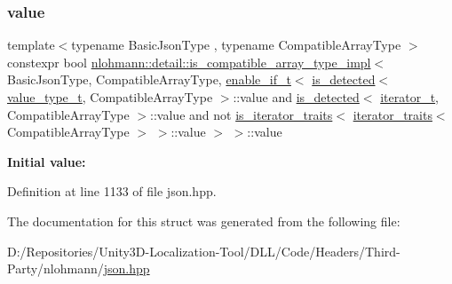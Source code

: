 \subsubsection{\texorpdfstring{value}{value}}
{\footnotesize\ttfamily template$<$typename Basic\+Json\+Type , typename Compatible\+Array\+Type $>$ \\
constexpr bool \mbox{\hyperlink{structnlohmann_1_1detail_1_1is__compatible__array__type__impl}{nlohmann\+::detail\+::is\+\_\+compatible\+\_\+array\+\_\+type\+\_\+impl}}$<$ Basic\+Json\+Type, Compatible\+Array\+Type, \mbox{\hyperlink{namespacenlohmann_1_1detail_a02bcbc878bee413f25b985ada771aa9c}{enable\+\_\+if\+\_\+t}}$<$ \mbox{\hyperlink{namespacenlohmann_1_1detail_a9135fcf616d6ac6e231a86e0a055ac44}{is\+\_\+detected}}$<$ \mbox{\hyperlink{namespacenlohmann_1_1detail_af91beae90c2fb0f931079b3d50a343bc}{value\+\_\+type\+\_\+t}}, Compatible\+Array\+Type $>$\+::value and \mbox{\hyperlink{namespacenlohmann_1_1detail_a9135fcf616d6ac6e231a86e0a055ac44}{is\+\_\+detected}}$<$ \mbox{\hyperlink{namespacenlohmann_1_1detail_a9ff93db146174305bce1bc4c54703e11}{iterator\+\_\+t}}, Compatible\+Array\+Type $>$\+::value and not \mbox{\hyperlink{structnlohmann_1_1detail_1_1is__iterator__traits}{is\+\_\+iterator\+\_\+traits}}$<$ \mbox{\hyperlink{structnlohmann_1_1detail_1_1iterator__traits}{iterator\+\_\+traits}}$<$ Compatible\+Array\+Type $>$ $>$\+::value $>$ $>$\+::value\hspace{0.3cm}{\ttfamily [static]}}

{\bfseries Initial value\+:}
\begin{DoxyCode}{0}
\DoxyCodeLine{=}

\end{DoxyCode}


Definition at line 1133 of file json.\+hpp.



The documentation for this struct was generated from the following file\+:\begin{DoxyCompactItemize}
\item 
D\+:/\+Repositories/\+Unity3\+D-\/\+Localization-\/\+Tool/\+D\+L\+L/\+Code/\+Headers/\+Third-\/\+Party/nlohmann/\mbox{\hyperlink{json_8hpp}{json.\+hpp}}\end{DoxyCompactItemize}
